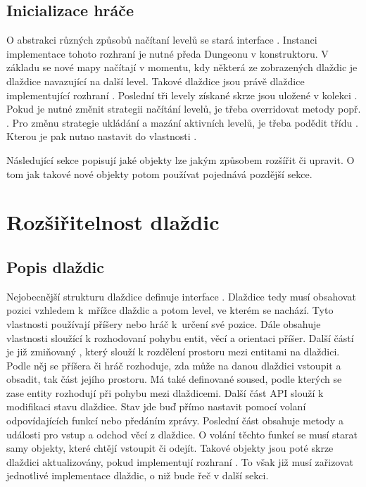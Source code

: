 \subsection{Inicializace hráče}
O abstrakci různých způsobů načítaní levelů se stará interface . Instanci implementace tohoto
rozhraní je nutné předa Dungeonu v konstruktoru. V základu se nové mapy načítají v momentu, kdy některá ze zobrazených
dlaždic je dlaždice navazující na další level. Takové dlaždice jsou právě dlaždice implementující  rozhraní  .
Poslední tři levely získané skrze  jsou uložené v kolekci . Pokud je nutné změnit 
strategii načítání levelů, je třeba overridovat metody  popř. . Pro změnu 
strategie ukládání a mazání aktivních levelů, je třeba podědit třídu . Kterou je pak nutno nastavit
do vlastnosti . 

Následující sekce popisují jaké objekty lze jakým způsobem rozšířit či upravit. O tom jak takové nové objekty potom používat
pojednává pozdější sekce.

\section{Rozšiřitelnost dlaždic}
\subsection{Popis dlaždic}
Nejobecnější strukturu dlaždice definuje interface . Dlaždice tedy musí obsahovat pozici vzhledem
k~mřížce dlaždic a potom level, ve kterém se nachází. Tyto vlastnosti používají příšery nebo hráč k~určení
své pozice. Dále obsahuje vlastnosti sloužící k rozhodovaní pohybu entit, věcí a orientaci příšer. Další částí
je již zmiňovaný , který slouží k rozdělení prostoru mezi entitami na dlaždici. Podle něj se 
příšera či hráč rozhoduje, zda může na danou dlaždici vstoupit a obsadit, tak část jejího prostoru. Má také definované
soused, podle kterých se zase entity rozhodují při pohybu mezi dlaždicemi. Další část API slouží k modifikaci stavu dlaždice.
Stav jde buď přímo nastavit pomocí volaní odpovídajících funkcí nebo předáním zprávy. Poslední
část obsahuje metody a události pro vstup a odchod věcí z dlaždice. O volání těchto  funkcí se musí starat samy objekty,
které chtějí vstoupit či odejít. Takové objekty jsou poté skrze dlaždici aktualizovány, pokud implementují rozhraní
. To však již musí zařizovat jednotlivé implementace dlaždic, o niž bude řeč v další sekci.

